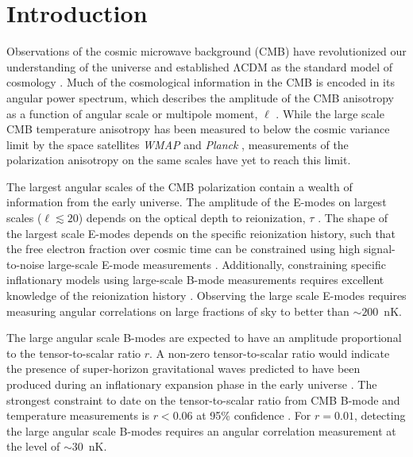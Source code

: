 \documentclass[twocolumn, tighten, numberedappendix, twocolappendix]{aastex63}
\begin{document}


\section{Introduction}

Observations of the cosmic microwave background (CMB) have revolutionized our understanding of the universe and established $\mathrm{\Lambda}$CDM as the standard model of cosmology \citep{wmap_yr1_bennett,wmap_yr1_spergel,bennett:2013}. Much of the cosmological information in the CMB is encoded in its angular power spectrum, which describes the amplitude of the CMB anisotropy as a function of angular scale or multipole moment, $\ell$ \citep{peeb70,doro78}. While the large scale CMB temperature anisotropy has been measured to below the cosmic variance limit by the space satellites \textit{WMAP} \citep{Hinshaw2013} and \textit{Planck} \citep{planck2016-l01}, measurements of the polarization anisotropy on the same scales have yet to reach this limit. 

The largest angular scales of the CMB polarization contain a wealth of information from the early universe. The amplitude of the E-modes on largest scales ($\ell \lesssim 20$) depends on the optical depth to reionization, $\tau$ \citep{Page2007,planck2016-l06}. The shape of the largest scale E-modes depends on the specific reionization history, such that the free electron fraction over cosmic time can be constrained using high signal-to-noise large-scale E-mode measurements \citep{hu, heinrich, watts2020}. Additionally, constraining specific inflationary models using large-scale B-mode measurements requires excellent knowledge of the reionization history \citep{obied}. Observing the large scale E-modes requires measuring angular correlations on large fractions of sky to better than $\sim200$~nK. 

The large angular scale B-modes are expected to have an amplitude proportional to the tensor-to-scalar ratio $r$. A non-zero tensor-to-scalar ratio would indicate the presence of super-horizon gravitational waves predicted to have been produced during an inflationary expansion phase in the early universe \citep{kami97,Sel_Zal1997}. The strongest constraint to date on the tensor-to-scalar ratio from CMB B-mode and temperature measurements is $r<0.06$ at 95\% confidence \citep{bicep2_2018_2015}. For $r=0.01$, detecting the large angular scale B-modes requires an angular correlation measurement at the level of $\sim30$~nK. 
\end{document}
